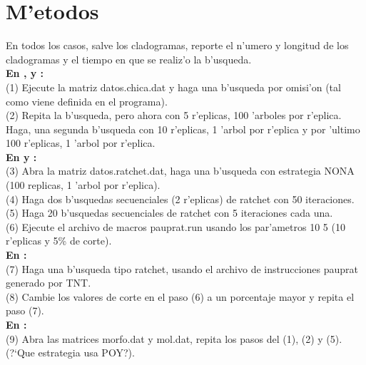 \section{M'etodos}
\noindent
En todos los casos, salve los cladogramas, reporte el n'umero y longitud de los
cladogramas y el tiempo en que se realiz'o la b'usqueda.\\
\textbf{En ,  y :}\\
(1) Ejecute la matriz datos.chica.dat y haga una b'usqueda por omisi'on (tal
como viene definida en el programa).\\
(2) Repita la b'usqueda, pero ahora con 5 r'eplicas, 100 'arboles por r'eplica.
Haga, una segunda b'usqueda con 10 r'eplicas, 1 'arbol por r'eplica y por
'ultimo 100 r'eplicas, 1 'arbol por r'eplica.\\
\textbf{En  y :}\\
(3) Abra la matriz datos.ratchet.dat, haga una b'usqueda con estrategia NONA
(100 replicas, 1 'arbol por r'eplica).\\
(4) Haga dos b'usquedas secuenciales (2 r'eplicas) de ratchet con 50
iteraciones.\\
(5) Haga 20 b'usquedas secuenciales de ratchet con 5 iteraciones cada una.\\
(6) Ejecute el archivo de macros pauprat.run usando los par'ametros 10 5 (10
r'eplicas y 5\% de corte).
\\
\textbf{En :}\\
(7) Haga una b'usqueda tipo ratchet, usando el archivo de instrucciones pauprat
generado por TNT.\\
(8) Cambie los valores de corte en el paso (6) a un porcentaje mayor y repita el
paso (7).
\\
\textbf{En :}\\
(9) Abra las matrices morfo.dat y mol.dat, repita los pasos del (1), (2) y (5).
(?`Que estrategia usa POY?).
